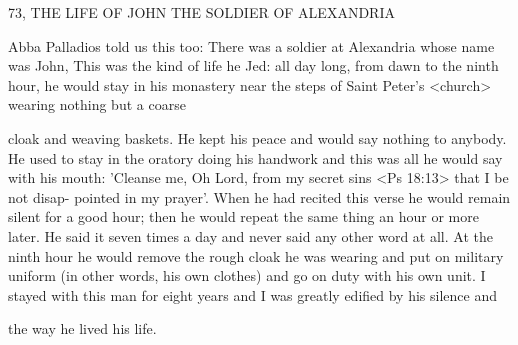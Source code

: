 73, THE LIFE OF JOHN THE SOLDIER
OF ALEXANDRIA

Abba Palladios told us this too: There was a soldier at Alexandria
whose name was John, This was the kind of life he Jed: all day long,
from dawn to the ninth hour, he would stay in his monastery near
the steps of Saint Peter's <church> wearing nothing but a coarse

cloak and weaving baskets.
He kept his peace and would say
nothing to anybody.
He used to stay in the oratory doing his
handwork and this was all he would say with his mouth: 'Cleanse
me, Oh Lord, from my secret sins <Ps 18:13> that I be not disap-
pointed in my prayer'.
When he had recited this verse he would
remain silent for a good hour; then he would repeat the same thing
an hour or more later.
He said it seven times a day and never said
any other word at all.
At the ninth hour he would remove the rough
cloak he was wearing and put on military uniform (in other words,
his own clothes) and go on duty with his own unit.
I stayed with
this man for eight years and I was greatly edified by his silence and

the way he lived his life.

